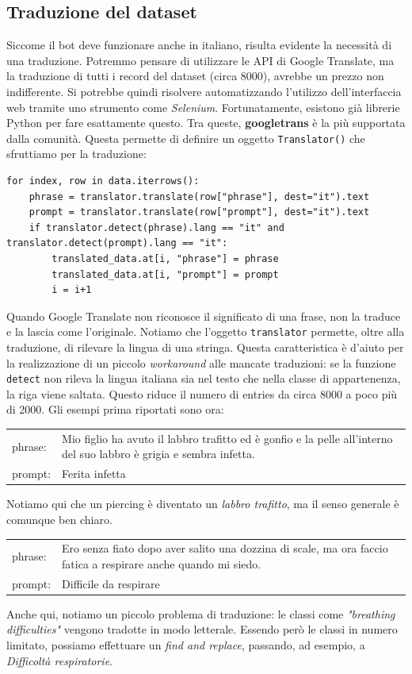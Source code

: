 \subsection{Traduzione del dataset}
\label{section:traduzione}
Siccome il bot deve funzionare anche in italiano, risulta evidente la necessità di una traduzione. Potremmo pensare di utilizzare le API di Google Translate, ma la traduzione di tutti i record del dataset (circa 8000), avrebbe un prezzo non indifferente. Si potrebbe quindi risolvere automatizzando l'utilizzo dell'interfaccia web tramite uno strumento come \textit{Selenium}. Fortunatamente, esistono già librerie Python per fare esattamente questo. Tra queste, \textbf{googletrans} è la più supportata dalla comunità.
Questa permette di definire un oggetto \texttt{Translator()} che sfruttiamo per la traduzione:
\begin{verbatim}
for index, row in data.iterrows():
    phrase = translator.translate(row["phrase"], dest="it").text
    prompt = translator.translate(row["prompt"], dest="it").text
    if translator.detect(phrase).lang == "it" and translator.detect(prompt).lang == "it":
        translated_data.at[i, "phrase"] = phrase
        translated_data.at[i, "prompt"] = prompt
        i = i+1
\end{verbatim}
Quando Google Translate non riconosce il significato di una frase, non la traduce e la lascia come l'originale.
Notiamo che l'oggetto \texttt{translator} permette, oltre alla traduzione, di rilevare la lingua di una stringa. Questa caratteristica è d'aiuto per la realizzazione di un piccolo \textit{workaround} alle mancate traduzioni: se la funzione \texttt{detect} non rileva la lingua italiana sia nel testo che nella classe di appartenenza, la riga viene saltata. Questo riduce il numero di entries da circa 8000 a poco più di 2000. Gli esempi prima riportati sono ora:
\begin{table}[H]
    \begin{tabularx}{\textwidth}{|l|X|}
        phrase: & Mio figlio ha avuto il labbro trafitto ed è gonfio e la pelle all'interno del suo labbro è grigia e sembra infetta.
        \\
        prompt: & Ferita infetta
    \end{tabularx}
\end{table}
Notiamo qui che un piercing è diventato un \textit{labbro trafitto}, ma il senso generale è comunque ben chiaro.
\begin{table}[H]
    \begin{tabularx}{\textwidth}{|l|X|}
        phrase: & Ero senza fiato dopo aver salito una dozzina di scale, ma ora faccio fatica a respirare anche quando mi siedo.
        \\
        prompt: & Difficile da respirare
    \end{tabularx}
\end{table}
Anche qui, notiamo un piccolo problema di traduzione: le classi come \textit{"breathing difficulties"} vengono tradotte in modo letterale. Essendo però le classi in numero limitato, possiamo effettuare un \textit{find and replace}, passando, ad esempio, a \textit{Difficoltà respiratorie}.

